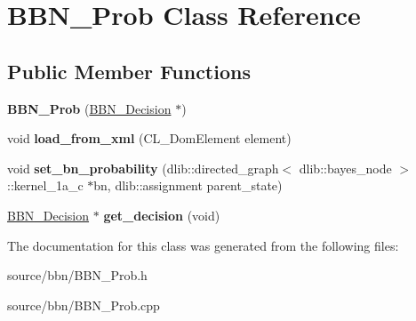 \hypertarget{classBBN__Prob}{
\section{BBN\_\-Prob Class Reference}
\label{classBBN__Prob}
}
\subsection*{Public Member Functions}
\begin{DoxyCompactItemize}
\item 
\hypertarget{classBBN__Prob_a77187dfbe0e9369661db43330bccdf02}{
{\bfseries BBN\_\-Prob} (\hyperlink{classBBN__Decision}{BBN\_\-Decision} $\ast$)}
\label{classBBN__Prob_a77187dfbe0e9369661db43330bccdf02}

\item 
\hypertarget{classBBN__Prob_a5c214de5fff28ed8e99dd16abf26e364}{
void {\bfseries load\_\-from\_\-xml} (CL\_\-DomElement element)}
\label{classBBN__Prob_a5c214de5fff28ed8e99dd16abf26e364}

\item 
\hypertarget{classBBN__Prob_a730d393acf5eb9c9f2592d628f2d8a96}{
void {\bfseries set\_\-bn\_\-probability} (dlib::directed\_\-graph$<$ dlib::bayes\_\-node $>$::kernel\_\-1a\_\-c $\ast$bn, dlib::assignment parent\_\-state)}
\label{classBBN__Prob_a730d393acf5eb9c9f2592d628f2d8a96}

\item 
\hypertarget{classBBN__Prob_a09884eaa842a8998ec126627872c50fa}{
\hyperlink{classBBN__Decision}{BBN\_\-Decision} $\ast$ {\bfseries get\_\-decision} (void)}
\label{classBBN__Prob_a09884eaa842a8998ec126627872c50fa}

\end{DoxyCompactItemize}


The documentation for this class was generated from the following files:\begin{DoxyCompactItemize}
\item 
source/bbn/BBN\_\-Prob.h\item 
source/bbn/BBN\_\-Prob.cpp\end{DoxyCompactItemize}
